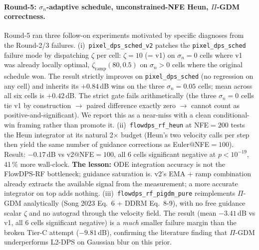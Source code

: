 \documentclass{article}
\begin{document}
\paragraph{Round-5: $\sigma_n$-adaptive schedule, unconstrained-NFE Heun, $\Pi$-GDM correctness.}
Round-5 ran three follow-on experiments motivated by specific
diagnoses from the Round-2/3 failures. (i)~\texttt{pixel\_dps\_sched\_v2}
patches the \texttt{pixel\_dps\_sched} failure mode by dispatching
$\zeta$ per cell: $\zeta{=}10$ (= v1) on $\sigma_n{=}0$ cells where
v1 was already locally optimal, $\zeta_{\text{ramp}}(80, 0.5)$
on $\sigma_n{>}0$ cells where the original schedule won. The result
strictly improves on \texttt{pixel\_dps\_sched} (no regression on any
cell) and inherits its $+0.84$\,dB wins on the three $\sigma_n{=}0.05$
cells; mean across all six cells is $+0.42$\,dB. The strict gate
fails arithmetically (the three $\sigma_n{=}0$ cells tie v1 by
construction $\to$ paired difference exactly zero $\to$ cannot count
as positive-and-significant). We report this as a near-miss with a
clean conditional-win framing rather than promote it.
(ii)~\texttt{flowdps\_rf\_heun} at NFE${=}200$ tests the Heun
integrator at its natural 2$\times$ budget (Heun's two velocity calls
per step then yield the same number of guidance corrections as
Euler${@}$NFE${=}100$). Result: $-0.17$\,dB vs v2${@}$NFE${=}100$,
all 6 cells significant negative at $p<10^{-19}$, 41\,\% more
wall-clock. \textbf{The lesson:} ODE integration accuracy is not the
FlowDPS-RF bottleneck; guidance saturation is. v2's EMA $+$ ramp
combination already extracts the available signal from the
measurement; a more accurate integrator on top adds nothing.
(iii)~\texttt{flowdps\_rf\_pigdm\_pure} reimplements $\Pi$-GDM
analytically (Song 2023 Eq.~6 + DDRM Eq.~8-9), with no free guidance
scalar $\zeta$ and no autograd through the velocity field. The result
(mean $-3.41$\,dB vs v1, all 6 cells significant negative) is a
\emph{much} smaller failure margin than the broken Tier-C attempt
($-9.81$\,dB), confirming the literature finding that $\Pi$-GDM
underperforms L2-DPS on Gaussian blur on this prior.
\end{document}
